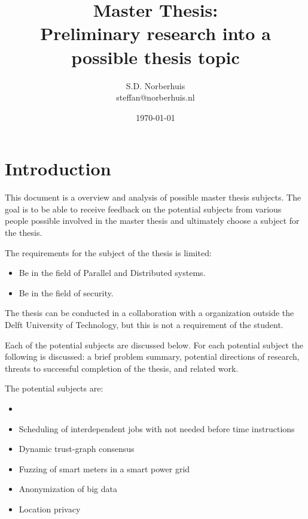 \documentclass{article}
\title{Master Thesis:\\ Preliminary research into a possible thesis topic}
\author{S.D. Norberhuis\\steffan@norberhuis.nl}
\date{\today}
\begin{document}
\maketitle

\tableofcontents

\section{Introduction}
This document is a overview and analysis of possible master thesis subjects.
The goal is to be able to receive feedback on the potential subjects from various people possible involved in the master thesis
and ultimately choose a subject for the thesis.

The requirements for the subject of the thesis is limited:
\begin{itemize}
\item Be in the field of Parallel and Distributed systems.
\item Be in the field of security.
\end{itemize}
The thesis can be conducted in a collaboration with a organization outside the Delft University of Technology,
but this is not a requirement of the student. 

Each of the potential subjects are discussed below.
For each potential subject the following is discussed: 
a brief problem summary, potential directions of research, threats to successful completion of the thesis, and related work.

The potential subjects are:
\begin{itemize}
	\item 	\item Scheduling of interdependent jobs with not needed before time instructions
	\item Dynamic trust-graph consensus
	\item Fuzzing of smart meters in a smart power grid
	\item Anonymization of big data
	\item Location privacy
\end{itemize}









\end{document}
